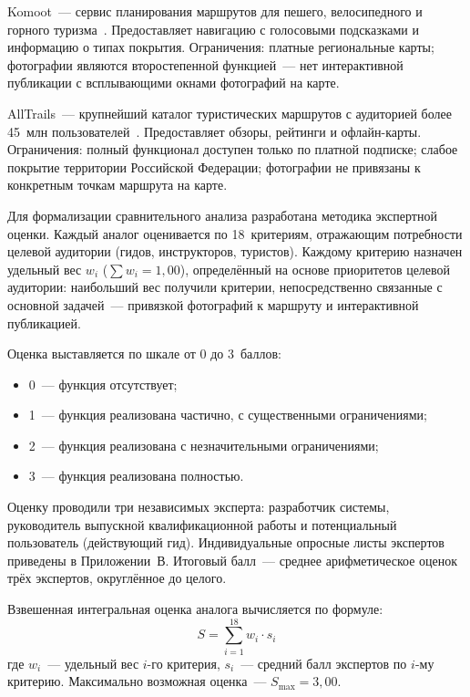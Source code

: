 Komoot~--- сервис планирования маршрутов для пешего, велосипедного и горного туризма~\cite{komoot}. Предоставляет навигацию с голосовыми подсказками и информацию о типах покрытия. Ограничения: платные региональные карты; фотографии являются второстепенной функцией~--- нет интерактивной публикации с всплывающими окнами фотографий на карте.

AllTrails~--- крупнейший каталог туристических маршрутов с аудиторией более 45~млн пользователей~\cite{alltrails}. Предоставляет обзоры, рейтинги и офлайн-карты. Ограничения: полный функционал доступен только по платной подписке; слабое покрытие территории Российской Федерации; фотографии не привязаны к конкретным точкам маршрута на карте.

Для формализации сравнительного анализа разработана методика экспертной оценки. Каждый аналог оценивается по 18~критериям, отражающим потребности целевой аудитории (гидов, инструкторов, туристов). Каждому критерию назначен удельный вес $w_i$ ($\sum w_i = 1{,}00$), определённый на основе приоритетов целевой аудитории: наибольший вес получили критерии, непосредственно связанные с основной задачей~--- привязкой фотографий к маршруту и интерактивной публикацией.

Оценка выставляется по шкале от 0 до 3~баллов:
\begin{itemize}
  \item 0~--- функция отсутствует;
  \item 1~--- функция реализована частично, с существенными ограничениями;
  \item 2~--- функция реализована с незначительными ограничениями;
  \item 3~--- функция реализована полностью.
\end{itemize}

Оценку проводили три независимых эксперта: разработчик системы, руководитель выпускной квалификационной работы и потенциальный пользователь (действующий гид). Индивидуальные опросные листы экспертов приведены в Приложении~В. Итоговый балл~--- среднее арифметическое оценок трёх экспертов, округлённое до целого.

Взвешенная интегральная оценка аналога вычисляется по формуле:
\begin{equation}
  S = \sum_{i=1}^{18} w_i \cdot s_i
  \label{eq:weighted-score}
\end{equation}
где $w_i$~--- удельный вес $i$-го критерия, $s_i$~--- средний балл экспертов по $i$-му критерию. Максимально возможная оценка~--- $S_{\max} = 3{,}00$.

